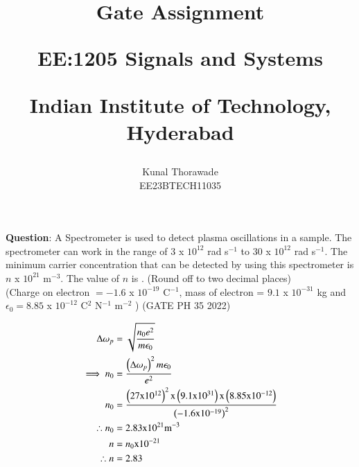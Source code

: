\documentclass[journal,12pt,twocolumn]{IEEEtran}
\theoremstyle{remark}
\begin{document}
%




\vspace{3cm}

\title{
Gate Assignment

\large{EE:1205 Signals and Systems}

Indian Institute of Technology, Hyderabad
}
\author{Kunal Thorawade

EE23BTECH11035
}	
\maketitle


\newpage


\bigskip
 
 \renewcommand{\thefigure}{\theenumi}
 \renewcommand{\thetable}{\arabic{table}}
 \renewcommand{\thefigure}{\arabic{figure}}

 \textbf{Question}:
 A Spectrometer is used to detect plasma oscillations in a sample. The spectrometer 
 can work in the range of $3$ x $10^{12}$ rad s$^{-1}$ to $30$ x $10^{12}$ rad s$^{-1}$. The minimum carrier concentration that can be detected by using this spectrometer is $n$ x $10^{21}$ m$^{-3}$. The value of $n$ is \underline{\hspace{2cm}}. (Round off to two decimal places) \\
 (Charge on electron $= -1.6$ x $10^{-19} $ C$^{-1}$, mass of electron = $9.1$ x $10^{-31}$ kg and $\epsilon_0 = 8.85$ x $10^{-12}$ C$^{2}$ N$^{-1}$ m$^{-2}$ ) \hfill(GATE PH 35 2022)\\
 \solution 
 
 \begin{align}
     \Delta\omega_p &= \sqrt{\frac{n_0e^2}{m\epsilon_0}} \\
         \implies n_0 &= \frac{\left(\Delta\omega_p\right)^2m\epsilon_0}{e^2} \\
	     n_0 &= \frac{\left(27 \text{x} 10^{12}\right)^2 \text{x} \left(9.1 \text{x} 10^{31} \right)\text{x} \left(8.85 \text{x} 10^{-12}\right)}{\left(-1.6 \text{x} 10^{-19}\right)^2} \\
	         \therefore n_0 &= 2.83 \text{x} 10^{21} \text{m}^{-3} \\
		     n &= n_0 \text{x} 10^{-21} \\
		         \therefore n &= 2.83
			 \end{align}
			 
\end{document}
